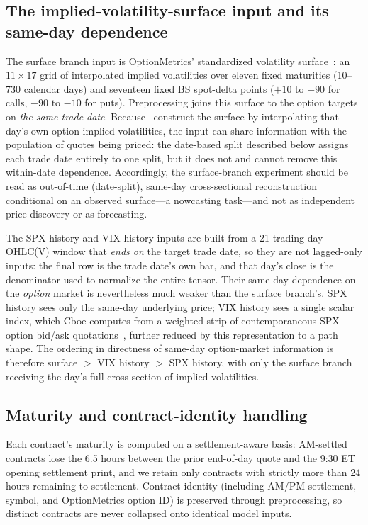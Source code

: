 \documentclass[11pt]{article}
\begin{document}
\subsection{The implied-volatility-surface input and its same-day dependence}
\label{sec:data-surface}
The surface branch input is OptionMetrics' standardized volatility
surface~\citep{OptionMetrics2026Surface}: an $11 \times 17$ grid of interpolated implied volatilities over
eleven fixed maturities (10--730 calendar days) and seventeen fixed BS spot-delta points ($+10$ to
$+90$ for calls, $-90$ to $-10$ for puts). Preprocessing joins this surface to the option targets on
\emph{the same trade date}. Because~\citet{OptionMetrics2026Surface} construct the surface by
interpolating that day's own option implied volatilities, the input can share information with the
population of quotes being priced: the date-based split described below assigns each trade date
entirely to one split, but it does not and cannot remove this within-date dependence. Accordingly, the
surface-branch experiment should be read as out-of-time (date-split), same-day cross-sectional
reconstruction conditional on an observed surface---a nowcasting task---and not as independent
price discovery or as forecasting.

The SPX-history and VIX-history inputs are built from a 21-trading-day OHLC(V) window that \emph{ends
on} the target trade date, so they are not lagged-only inputs: the final row is the trade date's own
bar, and that day's close is the denominator used to normalize the entire tensor. Their same-day
dependence on the \emph{option} market is nevertheless much weaker than the surface branch's. SPX
history sees only the same-day underlying price; VIX history sees a single scalar index, which Cboe
computes from a weighted strip of contemporaneous SPX option bid/ask
quotations~\citep{Cboe2026VIXFAQ}, further reduced by this representation to a path shape. The ordering in
directness of same-day option-market information is therefore surface $>$ VIX history $>$ SPX history,
with only the surface branch receiving the day's full cross-section of implied volatilities.

\subsection{Maturity and contract-identity handling}
\label{sec:data-maturity}
Each contract's maturity is computed on a settlement-aware basis: AM-settled contracts lose the 6.5
hours between the prior end-of-day quote and the 9:30 ET opening settlement print, and we retain only
contracts with strictly more than 24 hours remaining to settlement. Contract identity (including
AM/PM settlement, symbol, and OptionMetrics option ID) is preserved through preprocessing, so distinct
contracts are never collapsed onto identical model inputs.
\end{document}
